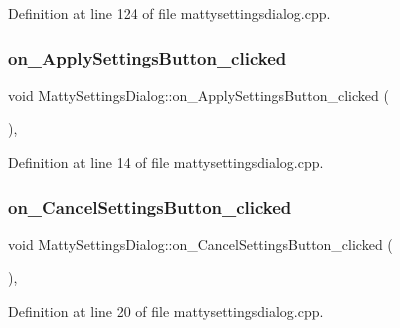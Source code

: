 Definition at line 124 of file mattysettingsdialog.\+cpp.

\hypertarget{classMattySettingsDialog_a8865f6098ec5170a9b2883827e5f7d1d}{}\label{classMattySettingsDialog_a8865f6098ec5170a9b2883827e5f7d1d} 
\subsubsection{\texorpdfstring{on\+\_\+\+Apply\+Settings\+Button\+\_\+clicked}{on\_ApplySettingsButton\_clicked}}
{\footnotesize\ttfamily void Matty\+Settings\+Dialog\+::on\+\_\+\+Apply\+Settings\+Button\+\_\+clicked (\begin{DoxyParamCaption}{ }\end{DoxyParamCaption})\hspace{0.3cm}{\ttfamily [private]}, {\ttfamily [slot]}}



Definition at line 14 of file mattysettingsdialog.\+cpp.

\hypertarget{classMattySettingsDialog_afac985297c5a7a526a036b84ce99e606}{}\label{classMattySettingsDialog_afac985297c5a7a526a036b84ce99e606} 
\subsubsection{\texorpdfstring{on\+\_\+\+Cancel\+Settings\+Button\+\_\+clicked}{on\_CancelSettingsButton\_clicked}}
{\footnotesize\ttfamily void Matty\+Settings\+Dialog\+::on\+\_\+\+Cancel\+Settings\+Button\+\_\+clicked (\begin{DoxyParamCaption}{ }\end{DoxyParamCaption})\hspace{0.3cm}{\ttfamily [private]}, {\ttfamily [slot]}}



Definition at line 20 of file mattysettingsdialog.\+cpp.

\hypertarget{classMattySettingsDialog_a4e0c6d5ea1b0a3a40a0f856386c21bce}{}\label{classMattySettingsDialog_a4e0c6d5ea1b0a3a40a0f856386c21bce} 
